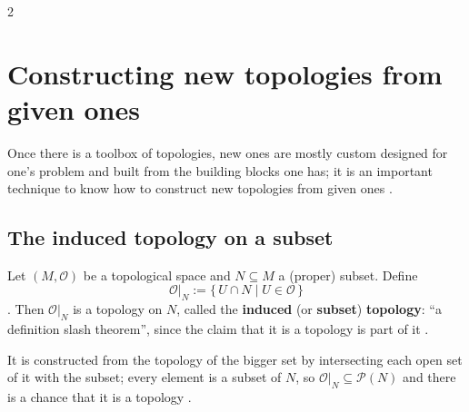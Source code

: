 \begin{paracol}{2}
\section{Constructing new topologies from given ones}\label{sec:to-construct}

Once there is a toolbox of topologies, new ones are mostly custom designed for one's problem and built from the
building blocks one has; it is an important technique to know how to construct new topologies from given ones
.

\subsection{The induced topology on a subset}

\begin{definition}\label{def:to-induced}
Let $(M,\mathcal O)$ be a topological space and $N\subseteq M$ a (proper) subset. Define
\[
  \mathcal O|_N:=\{\,U\cap N\mid U\in\mathcal O\,\}
\]
. Then $\mathcal O|_N$ is a topology on $N$, called the \textbf{induced}
(or \textbf{subset}) \textbf{topology}: ``a definition slash theorem'', since the claim that it is a topology is part of
it .
\end{definition}
It is constructed from the topology of the bigger set by intersecting each open set of it with the subset; every element
is a subset of $N$, so $\mathcal O|_N\subseteq\mathcal P(N)$ and there is a chance that it is a topology
.


\end{paracol}
